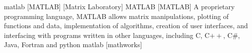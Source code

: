 \newglsXsoftware%
{matlab}%
[MATLAB]%
[Matrix Laboratory]%
{MATLAB\textsuperscript{\texttrademark}}%
[MATLAB]%
{A proprietary programming language, MATLAB allows matrix manipulations, plotting of functions and data, implementation of algorithms, creation of user interfaces, and interfacing with programs written in other languages, including C, C$++$, C$\#$, Java, Fortran and \gls{python} \cite{website:MATLAB}}%
{matlab}%
[mathworks]%